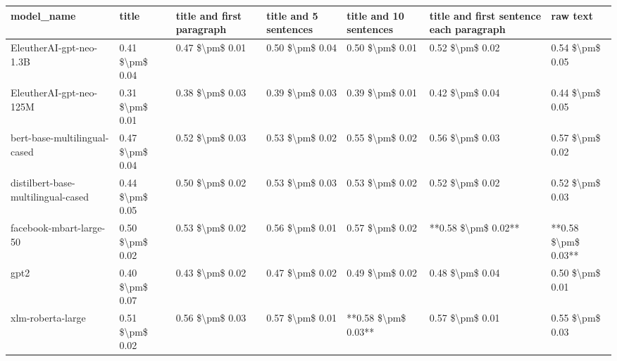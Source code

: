 \begin{tabular}{lllllll}
\toprule
                        model\_name &           title & title and first paragraph & title and 5 sentences & title and 10 sentences & title and first sentence each paragraph &            raw text \\
\midrule
           EleutherAI-gpt-neo-1.3B & 0.41 \$\textbackslash pm\$ 0.04 &           0.47 \$\textbackslash pm\$ 0.01 &       0.50 \$\textbackslash pm\$ 0.04 &        0.50 \$\textbackslash pm\$ 0.01 &                         0.52 \$\textbackslash pm\$ 0.02 &     0.54 \$\textbackslash pm\$ 0.05 \\
           EleutherAI-gpt-neo-125M & 0.31 \$\textbackslash pm\$ 0.01 &           0.38 \$\textbackslash pm\$ 0.03 &       0.39 \$\textbackslash pm\$ 0.03 &        0.39 \$\textbackslash pm\$ 0.01 &                         0.42 \$\textbackslash pm\$ 0.04 &     0.44 \$\textbackslash pm\$ 0.05 \\
      bert-base-multilingual-cased & 0.47 \$\textbackslash pm\$ 0.04 &           0.52 \$\textbackslash pm\$ 0.03 &       0.53 \$\textbackslash pm\$ 0.02 &        0.55 \$\textbackslash pm\$ 0.02 &                         0.56 \$\textbackslash pm\$ 0.03 &     0.57 \$\textbackslash pm\$ 0.02 \\
distilbert-base-multilingual-cased & 0.44 \$\textbackslash pm\$ 0.05 &           0.50 \$\textbackslash pm\$ 0.02 &       0.53 \$\textbackslash pm\$ 0.03 &        0.53 \$\textbackslash pm\$ 0.02 &                         0.52 \$\textbackslash pm\$ 0.02 &     0.52 \$\textbackslash pm\$ 0.03 \\
           facebook-mbart-large-50 & 0.50 \$\textbackslash pm\$ 0.02 &           0.53 \$\textbackslash pm\$ 0.02 &       0.56 \$\textbackslash pm\$ 0.01 &        0.57 \$\textbackslash pm\$ 0.02 &                     **0.58 \$\textbackslash pm\$ 0.02** & **0.58 \$\textbackslash pm\$ 0.03** \\
                              gpt2 & 0.40 \$\textbackslash pm\$ 0.07 &           0.43 \$\textbackslash pm\$ 0.02 &       0.47 \$\textbackslash pm\$ 0.02 &        0.49 \$\textbackslash pm\$ 0.02 &                         0.48 \$\textbackslash pm\$ 0.04 &     0.50 \$\textbackslash pm\$ 0.01 \\
                 xlm-roberta-large & 0.51 \$\textbackslash pm\$ 0.02 &           0.56 \$\textbackslash pm\$ 0.03 &       0.57 \$\textbackslash pm\$ 0.01 &    **0.58 \$\textbackslash pm\$ 0.03** &                         0.57 \$\textbackslash pm\$ 0.01 &     0.55 \$\textbackslash pm\$ 0.03 \\
\bottomrule
\end{tabular}
